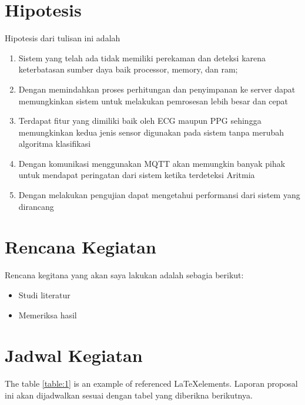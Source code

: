 \section{Hipotesis}
Hipotesis dari tulisan ini adalah
\begin{enumerate}
    \item Sistem yang telah ada tidak memiliki perekaman dan deteksi karena keterbatasan sumber daya baik processor, memory, dan ram;
    \item Dengan memindahkan proses perhitungan dan penyimpanan ke server dapat memungkinkan sistem untuk melakukan pemrosesan lebih besar dan cepat
    \item Terdapat fitur yang dimiliki baik oleh ECG maupun PPG sehingga memungkinkan kedua jenis sensor digunakan pada sistem tanpa merubah algoritma klasifikasi
    \item Dengan komunikasi menggunakan MQTT akan memungkin banyak pihak untuk mendapat peringatan dari sistem ketika terdeteksi Aritmia
	\item Dengan melakukan pengujian dapat mengetahui performansi dari sistem yang dirancang
    
\end{enumerate}
\iflogTA
\else
\section{Rencana Kegiatan}
Rencana kegitana yang akan saya lakukan adalah sebagia berikut:
\begin{itemize}
    \item Studi literatur
    \item Memeriksa hasil
\end{itemize}
\section{Jadwal Kegiatan}
The table \ref{table:1} is an example of referenced \LaTeX elements. Laporan proposal ini akan dijadwalkan sesuai dengan tabel yang diberikna berikutnya. 

